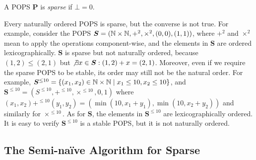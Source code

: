 
%
\begin{defn}
  \label{def:sparse}
  A POPS $\bm P$ is {\em sparse} if $\bot = 0$.
\end{defn}
%
Every naturally ordered POPS is sparse, but the converse is not true.
For example, 
 consider the POPS $\bm S = (\mathbb N \times \mathbb N, +^2, \times^2, (0, 0), (1, 1))$,
 where $+^2$ and $\times^2$ mean to apply the operations component-wise,
 and the elements in $\bm S$ are ordered lexicographically.
$\bm S$ is sparse but not naturally ordered, 
 because $(1, 2) \leq (2, 1)$ but
 $\not \exists x \in {\bm S} : (1, 2) + x = (2, 1)$.
Moreover, even if we require the sparse POPS to be stable, 
 its order may still not be the natural order.
For example, $\bm S^{\leq 10} = \{{(x_1, x_2) \in \mathbb N \times \mathbb N }\mid{ x_1 \leq 10, x_2 \leq 10}\}$, 
 and ${\bm S}^{\leq 10} = (S^{\leq 10}, +^{\leq 10}, \times^{\leq 10}, 0, 1)$
 where $(x_1, x_2) +^{\leq 10} (y_1, y_2) = (\min(10, x_1 + y_1), \min(10, x_2 + y_2))$
 and similarly for $\times^{\leq 10}$.
As for $\bm S$, the elements in $\bm S^{\leq 10}$ are lexicographically ordered.
It is easy to verify ${\bm S}^{\leq 10}$ is a stable POPS, 
  but it is not naturally ordered.

\subsection{The Semi-na\"ive Algorithm for Sparse \datalogo}
\label{sec:semi-naive-algorithm}

